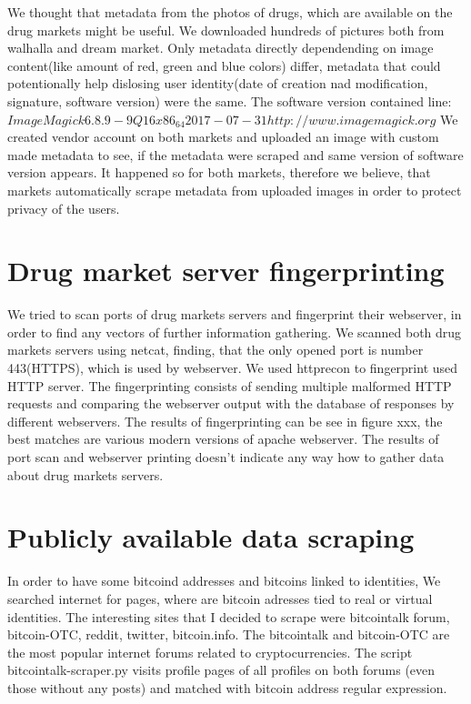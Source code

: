 \documentclass[
  digital, %
  table,   %
  lof,     %
  lot,     %
  oneside
]{fithesis3}
\begin{document}
We thought that metadata from the photos of drugs, which are available on the drug markets might be useful.
We downloaded hundreds of pictures both from walhalla and dream market.
Only metadata directly dependending on image content(like amount of red, green and blue colors) differ,
metadata that could potentionally help dislosing user identity(date of creation nad modification, signature, software version) were the same.
The software version contained line: $ImageMagick 6.8.9-9 Q16 x86_64 2017-07-31 http://www.imagemagick.org$
We created vendor account on both markets and uploaded an image with custom made metadata to see,
if the metadata were scraped and same version of software version appears. It happened so for both markets,
therefore we believe, that markets automatically scrape metadata from uploaded images in order to protect privacy of the users.

\section{Drug market server fingerprinting}
We tried to scan ports of drug markets servers and fingerprint their webserver, in order to find any vectors of further information gathering.
We scanned both drug markets servers using netcat, finding, that the only opened port is number 443(HTTPS), which is used by webserver.
We used httprecon to fingerprint used HTTP server. The fingerprinting consists of sending multiple malformed HTTP requests and comparing the webserver output with the database of responses by different webservers.
The results of fingerprinting can be see in figure xxx, the best matches are various modern versions of apache webserver.
The results of port scan and webserver printing doesn't indicate any way how to gather data about drug markets servers.

\section{Publicly available data scraping}
In order to have some bitcoind addresses and bitcoins linked to identities, We searched internet for pages, where are bitcoin adresses tied to real or virtual identities.
The interesting sites that I decided to scrape were bitcointalk forum, bitcoin-OTC, reddit, twitter, bitcoin.info.
The bitcointalk and bitcoin-OTC are the most popular internet forums related to cryptocurrencies. The script bitcointalk-scraper.py visits profile pages of all profiles on both forums (even those without any posts)
 and matched with bitcoin address regular expression.
 
\end{document}
